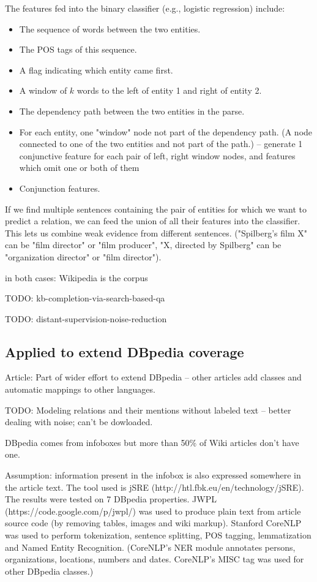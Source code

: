 The features fed into the binary classifier (e.g., logistic regression)
include:
\begin{itemize}
\item The sequence of words between the two entities.
\item The POS tags of this sequence.
\item A flag indicating which entity came first.
\item A window of $k$ words to the left of entity 1 and right of entity 2.
\item The dependency path between the two entities in the parse.
\item For each entity, one "window" node not part of the dependency path.
	(A node connected to one of the two entities and not part of the path.)
		-- generate 1 conjunctive feature for each pair of left, right
		window nodes, and features which omit one or both of them
	\cite{distant-supervision}
\item Conjunction features.
\end{itemize}

If we find multiple sentences containing the pair of entities for which we want
to predict a relation, we can feed the union of all their features into
the classifier. This lets us combine weak evidence from different sentences.
("Spilberg's film X" can be "film director" or "film producer", "X, directed by
Spilberg" can be "organization director" or "film director").

in both cases: Wikipedia is the corpus

TODO: kb-completion-via-search-based-qa

TODO: distant-supervision-noise-reduction

\subsection{Applied to extend DBpedia coverage}
Article:
\cite{extending-dbpedia-coverage-using-distant-supervision-over-wikipedia}
Part of wider effort to extend DBpedia -- other articles add classes and
automatic mappings to other languages.

TODO: Modeling relations and their mentions without labeled text -- better
dealing with noise; can't be dowloaded.

DBpedia comes from infoboxes but more than 50\% of Wiki articles don't have one.

Assumption: information present in the infobox is also expressed somewhere in
the article text. The tool used is jSRE (http://htl.fbk.eu/en/technology/jSRE).
The results were tested on 7 DBpedia properties.
JWPL (https://code.google.com/p/jwpl/) was used to produce plain text from
article source code (by removing tables, images and wiki markup). Stanford
CoreNLP was used to perform tokenization, sentence splitting, POS tagging,
lemmatization and Named Entity Recognition. (CoreNLP's NER module annotates
persons, organizations, locations, numbers and dates. CoreNLP's MISC tag was
used for other DBpedia classes.)

